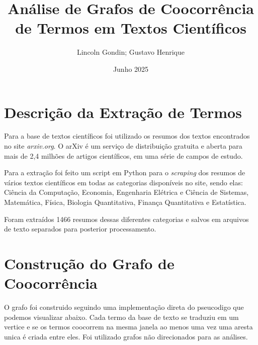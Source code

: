 \documentclass[12pt]{article}
\title{Análise de Grafos de Coocorrência de Termos em Textos Científicos}
\author{Lincoln Gondin; Gustavo Henrique}
\date{Junho 2025}
\begin{document}
\maketitle

\tableofcontents
\newpage

\section{Descrição da Extração de Termos}

Para a base de textos científicos foi utilizado os resumos dos textos encontrados no site \textit{arxiv.org}. O arXiv é um serviço de distribuição gratuita e aberta para mais de 2,4 milhões de artigos científicos, em uma série de campos de estudo.

Para a extração foi feito um script em Python para o \textit{scraping} dos resumos de vários textos científicos em todas as categorias disponíveis no site, sendo elas: Ciência da Computação, Economia, Engenharia Elétrica e Ciência de Sistemas, Matemática, Física, Biologia Quantitativa, Finança Quantitativa e Estatística.

Foram extraídos 1466 resumos dessas diferentes categorias e salvos em arquivos de texto separados para posterior processamento.

\section{Construção do Grafo de Coocorrência}

O grafo foi construido seguindo uma implementação direta do pseucodigo que podemos visualizar abaixo. Cada termo da base de texto se traduziu em um vertice e se os termos coocorrem na mesma janela ao menos uma vez uma aresta unica é criada entre eles. Foi utilizado grafos não direcionados para as análises.
\end{document}
